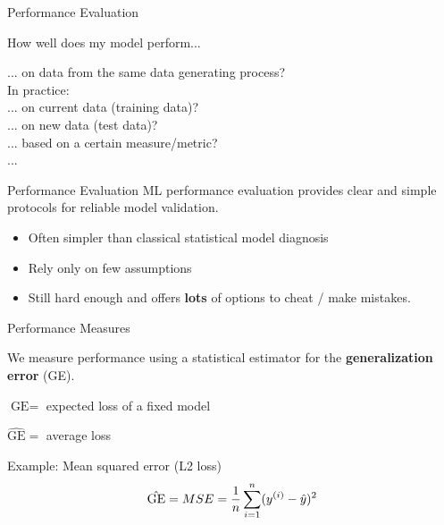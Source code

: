 \documentclass[11pt,compress,t,notes=noshow, xcolor=table]{beamer}
\begin{document}
\begin{vbframe}{Performance Evaluation}
\begin{center}
How well does my model perform...\\

\lz


\lz
... on data from the same data generating process?\\
\lz
In practice:\\
\lz
... on current data (training data)?\\
... on new data (test data)?\\
... based on a certain measure/metric?\\
...

\end{center}
\end{vbframe}




\begin{vbframe}{Performance Evaluation}
ML performance evaluation provides clear and simple protocols for reliable model
validation. 

\begin{itemize}
\item Often simpler than classical statistical model diagnosis 
\item Rely only on few assumptions 
\item Still hard enough and offers \textbf{lots} of options to cheat / make mistakes. 
\end{itemize}
\end{vbframe}

\begin{vbframe}{Performance Measures}

We measure performance using a statistical estimator for the 
\textbf{generalization error} (GE).

\lz
$\text{GE} = $ expected loss of a fixed model

\lz
$\hat{\text{GE}} = $ average loss 

\lz \lz

Example: Mean squared error (L2 loss)
\[
\hat{\text{GE}} = MSE = \frac{1}{n} \sum_{i=1}^n (y^{(i)} - \hat{y})^2
\]

\end{vbframe}
\end{document}
